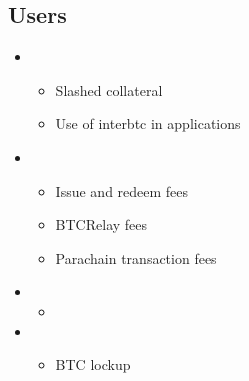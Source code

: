 \documentclass[a4paper,10pt,english]{sphinxmanual}
\begin{document}
\subsection{Users}
\label{\detokenize{economics/fees:users}}\begin{itemize}
\item {} 
\begin{itemize}
\item {} 
Slashed collateral

\item {} 
Use of interbtc in applications

\end{itemize}

\item {} 
\begin{itemize}
\item {} 
Issue and redeem fees

\item {} 
BTC\sphinxhyphen{}Relay fees

\item {} 
Parachain transaction fees

\end{itemize}

\item {} 
\begin{itemize}
\item {} 

\end{itemize}

\item {} 
\begin{itemize}
\item {} 
BTC lockup

\end{itemize}

\end{itemize}
\end{document}
